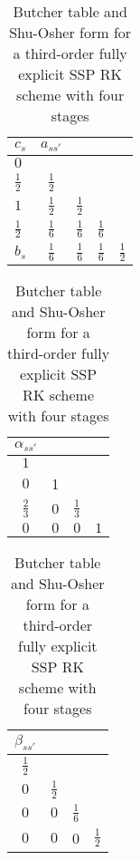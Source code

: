 \begin{table}[t]
\caption{Butcher table and Shu-Osher form for a third-order fully explicit SSP RK scheme with four stages}
\begin{subtable}{\linewidth}
\begin{tabular}{lcccc}
$c_s$ & $a_{ss'}$ & & & \\
\hline
$0$ & & & & \\
$\frac{1}{2}$ & $\frac{1}{2}$ &  & & \\
$1$ & $\frac{1}{2}$ & $\frac{1}{2}$ & & \\
$\frac{1}{2}$ & $\frac{1}{6}$ & $\frac{1}{6}$ & $\frac{1}{6}$ & \\
\hline
$b_s$ & $\frac{1}{6}$ & $\frac{1}{6}$ & $\frac{1}{6}$ & $\frac{1}{2}$  \\ 
\end{tabular}
\label{tb:Butcher_tbl_EXRK_SSPo3s4}
\end{subtable}
\vspace{.5cm}

\begin{subtable}{\linewidth}
\begin{tabular}{cccc}
$\alpha_{ss'}$ & & &\\
\hline
$1$ & &  &\\
$0$ & 1 & & \\
$\frac{2}{3}$ & $0$ & $\frac{1}{3}$ &\\
$0$ & $0$ & $0$ & $1$ \\
\hline
\end{tabular}
\hspace{.5cm}
\begin{tabular}{cccc}
$\beta_{ss'}$ & & &\\
\hline
$\frac{1}{2}$ & & & \\
$0$ & $\frac{1}{2}$ & & \\
$0$ & $0$ & $\frac{1}{6}$ & \\
$0$ & $0$ & 0 & $\frac{1}{2}$ \\
\hline
\end{tabular}
\label{tb:ShuOsher_tbl_EXRK_SSPo3s4}
\end{subtable}
\end{table}

